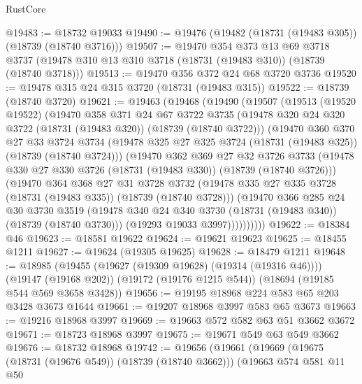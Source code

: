 \begin{lexlean}{RustCore}
\begin{coremodule}
@19483 := @18732 @19033
@19490 := @19476 (@19482 (@18731 (@19483 @305)) (@18739 (@18740 @3716)))
@19507 := @19470
    @354
    @373
    @13
    @69
    @3718
    @3737
    (@19478 @310 @13 @310 @3718 (@18731 (@19483 @310)) (@18739 (@18740 @3718)))
@19513 := @19470 @356 @372 @24 @68 @3720 @3736
@19520 := @19478 @315 @24 @315 @3720 (@18731 (@19483 @315))
@19522 := @18739 (@18740 @3720)
@19621 := @19463
    (@19468
      (@19490
        (@19507
          (@19513
            (@19520 @19522)
            (@19470
              @358
              @371
              @24
              @67
              @3722
              @3735
              (@19478 @320 @24 @320 @3722 (@18731 (@19483 @320)) (@18739 (@18740 @3722)))
              (@19470
                @360
                @370
                @27
                @33
                @3724
                @3734
                (@19478 @325 @27 @325 @3724 (@18731 (@19483 @325)) (@18739 (@18740 @3724)))
                (@19470
                  @362
                  @369
                  @27
                  @32
                  @3726
                  @3733
                  (@19478 @330 @27 @330 @3726 (@18731 (@19483 @330)) (@18739 (@18740 @3726)))
                  (@19470
                    @364
                    @368
                    @27
                    @31
                    @3728
                    @3732
                    (@19478 @335 @27 @335 @3728 (@18731 (@19483 @335)) (@18739 (@18740 @3728)))
                    (@19470
                      @366
                      @285
                      @24
                      @30
                      @3730
                      @3519
                      (@19478 @340 @24 @340 @3730 (@18731 (@19483 @340)) (@18739 (@18740 @3730)))
                      (@19293 @19033 @3997))))))))))
@19622 := @18384 @46
@19623 := @18581 @19622
@19624 := @19621 @19623
@19625 := @18455 @1211
@19627 := @19624 (@19305 @19625)
@19628 := @18479 @1211
@19648 := @18985
    (@19455 (@19627 (@19309 @19628) (@19314 (@19316 @46))))
    (@19147 (@19168 @202))
    (@19172 (@19176 @1215 @544))
    (@18694 (@19185 @544 @569 @3658 @3428))
@19656 := @19195 @18968 @224 @583 @65 @203 @3428 @3673 @1644
@19661 := @19207 @18968 @3997 @583 @65 @3673
@19663 := @19216 @18968 @3997
@19669 := @19663 @572 @582 @63 @51 @3662 @3672
@19671 := @18723 @18968 @3997
@19675 := @19671 @549 @63 @549 @3662
@19676 := @18732 @18968
@19742 := @19656
    (@19661
      (@19669
        (@19675 (@18731 (@19676 @549)) (@18739 (@18740 @3662)))
        (@19663
          @574
          @581
          @11
          @50

\end{coremodule}
\end{lexlean}
